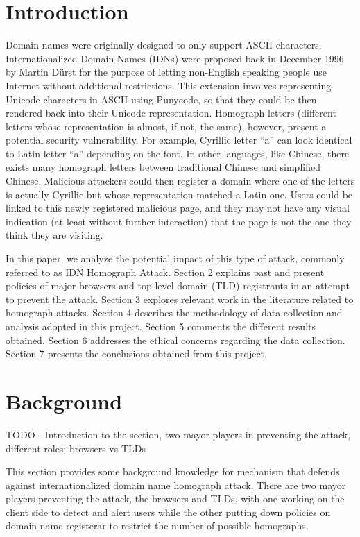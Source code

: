 \documentclass[letterpaper,twocolumn,10pt]{article}
\begin{document}
\section{Introduction}
Domain names were originally designed to only support ASCII characters.
Internationalized Domain Names (IDNs) were proposed back in December 1996 by Martin D\"{u}rst for the purpose of letting non-English speaking people use Internet without additional restrictions.
This extension involves representing Unicode characters in ASCII using Punycode, so that they could be then rendered back into their Unicode representation.
Homograph letters (different letters whose representation is almost, if not, the same), however, present a potential security vulnerability.
For example, Cyrillic letter ``a'' can look identical to Latin letter ``a'' depending on the font.
In other languages, like Chinese, there exists many homograph letters between traditional Chinese and simplified Chinese.
Malicious attackers could then register a domain where one of the letters is actually Cyrillic but whose representation matched a Latin one.
Users could be linked to this newly registered malicious page, and they may not have any visual indication (at least without further interaction) that the page is not the one they think they are visiting.

In this paper, we analyze the potential impact of this type of attack, commonly referred to as IDN Homograph Attack.
Section 2 explains past and present policies of major browsers and top-level domain (TLD) registrants in an attempt to prevent the attack.
Section 3 explores relevant work in the literature related to homograph attacks.
Section 4 describes the methodology of data collection and analysis adopted in this project.
Section 5 comments the different results obtained.
Section 6 addresses the ethical concerns regarding the data collection.
Section 7 presents the conclusions obtained from this project.

\section{Background}
TODO
- Introduction to the section, two mayor players in preventing the attack, different roles: browsers vs TLDs

This section provides some background knowledge for mechanism that defends against internationalized domain name homograph attack.
There are two mayor players preventing the attack, the browsers and TLDs, with one working on the client side to detect and alert users while the other putting down policies on domain name registerar to restrict the number of possible homographs.
\end{document}

